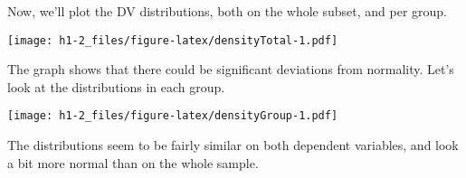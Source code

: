 \documentclass[12pt,]{article}
\newenvironment{Shaded}{\begin{snugshade}}{\end{snugshade}}
\newcommand{\DataTypeTok}[1]{\textcolor[rgb]{0.13,0.29,0.53}{#1}}
\newcommand{\FloatTok}[1]{\textcolor[rgb]{0.00,0.00,0.81}{#1}}
\newcommand{\KeywordTok}[1]{\textcolor[rgb]{0.13,0.29,0.53}{\textbf{#1}}}
\newcommand{\NormalTok}[1]{#1}
\newcommand{\OperatorTok}[1]{\textcolor[rgb]{0.81,0.36,0.00}{\textbf{#1}}}
\newcommand{\StringTok}[1]{\textcolor[rgb]{0.31,0.60,0.02}{#1}}
\begin{document}
Now, we'll plot the DV distributions, both on the whole subset, and per
group.

\begin{Shaded}
\end{Shaded}

\texttt{[image: h1-2\_files/figure-latex/densityTotal-1.pdf]}

The graph shows that there could be significant deviations from
normality. Let's look at the distributions in each group.

\begin{Shaded}
\end{Shaded}

\texttt{[image: h1-2\_files/figure-latex/densityGroup-1.pdf]}

The distributions seem to be fairly similar on both dependent variables,
and look a bit more normal than on the whole sample.
\end{document}
